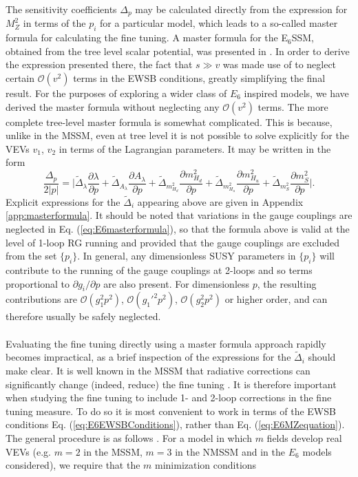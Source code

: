 \documentclass[preprint,amsmath,amssymb,aps,superscriptaddress,prd,showpacs,floatfix]{revtex4-1}
\begin{document}
The sensitivity coefficients $\Delta_p$ may be calculated directly from the expression for $M_Z^2$ in terms of the $p_i$ for a particular model, which leads to a so-called master formula for calculating the fine tuning. A master formula for the E$_6$SSM, obtained from the tree level scalar potential, was presented in \cite{Athron:2013ipa}. In order to derive the expression presented there, the fact that $s \gg v$ was made use of to neglect certain $\mathcal{O}(v^2)$ terms in the EWSB conditions, greatly simplifying the final result.
For the purposes of exploring a wider class of $E_6$ inspired models, we have derived the master formula without neglecting any $\mathcal{O}(v^2)$ terms. The more complete tree-level master formula is somewhat complicated. This is because, unlike in the MSSM, even at tree level it is not possible to solve explicitly for the VEVs $v_1$, $v_2$ in terms of the Lagrangian parameters. It may be written in the form
\begin{equation}\label{eq:E6masterformula}
\frac{\Delta_p}{2|p|}=\bigg|\tilde{\Delta}_\lambda\frac{\partial\lambda}{\partial p}+\tilde{\Delta}_{A_\lambda}\frac{\partial A_\lambda}{\partial p}+\tilde{\Delta}_{m_{H_d}^2}\frac{\partial m_{H_d}^2}{\partial p}+\tilde{\Delta}_{m_{H_u}^2}\frac{\partial m_{H_u}^2}{\partial p}+\tilde{\Delta}_{m_S^2}\frac{\partial m_S^2}{\partial p}\bigg|.
\end{equation}
Explicit expressions for the $\tilde{\Delta}_i$ appearing above are given in Appendix \ref{app:masterformula}. It should be noted that variations in the gauge couplings are neglected in Eq. (\ref{eq:E6masterformula}), so that the formula above is valid at the level of 1-loop RG running and provided that the gauge couplings are excluded from the set $\{p_i\}$. In general, any dimensionless SUSY parameters in $\{p_i\}$ will contribute to the running of the gauge couplings at 2-loops and so terms proportional to $\partial g_i /\partial p$ are also present. For dimensionless $p$, the resulting contributions are $\mathcal{O}(g_1^2p^2)$, $\mathcal{O}(g_1'^2p^2)$, $\mathcal{O}(g_2^2p^2)$ or higher order, and can therefore usually be safely neglected.\\ \\
Evaluating the fine tuning directly using a master formula approach rapidly becomes impractical, as a brief inspection of the expressions for the $\tilde{\Delta}_i$ should make clear. It is well known in the MSSM that radiative corrections can significantly change (indeed, reduce) the fine tuning \cite{Cassel:2010px}. It is therefore important when studying the fine tuning to include 1- and 2-loop corrections in the fine tuning measure. To do so it is most convenient to work in terms of the EWSB conditions Eq. (\ref{eq:E6EWSBConditions}), rather than Eq. (\ref{eq:E6MZequation}). The general procedure is as follows \cite{Ellwanger:2011mu}. For a model in which $m$ fields develop real VEVs (e.g. $m=2$ in the MSSM, $m=3$ in the NMSSM and in the $E_6$ models considered), we require that the $m$ minimization conditions
\end{document}
